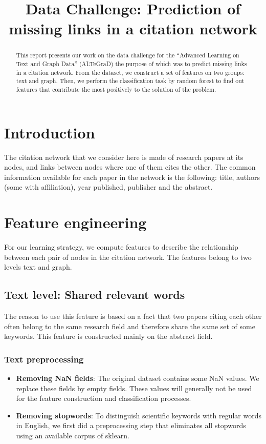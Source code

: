 \documentclass{article}
\title{Data Challenge: Prediction of missing links in a citation network}
\begin{document}
\ninept

\maketitle

\begin{abstract}
This report presents our work on the data challenge for the \enquote{Advanced Learning on Text and Graph Data} (ALTeGraD) the purpose of which was to predict missing links in a citation network. From the dataset, we construct a set of features on two groups: text and graph. Then, we perform the classification task by random forest to find out features that contribute the most positively to the solution of the problem.
\end{abstract}


\section{Introduction}

The citation network that we consider here is made of research papers at its nodes, and links between nodes where one of them cites the other. The common information available for each paper in the network is the following: title, authors (some with affiliation), year published, publisher and the abstract.

\section{Feature engineering}

For our learning strategy, we compute features to describe the relationship between each pair of nodes in the citation network. The features belong to two levels text and graph.

\subsection{Text level: Shared relevant words}

The reason to use this feature is based on a fact that two papers citing each other often belong to the same research field and therefore share the same set of some keywords. This feature is constructed mainly on the abstract field.
\subsubsection{Text preprocessing}
\begin{itemize}
\item \textbf{Removing NaN fields}: The original dataset contains some NaN values. We replace these fields by empty fields. These values will generally not be used for the feature construction and classification processes.
\item \textbf{Removing stopwords}: To distinguish scientific keywords with regular words in English, we first did a preprocessing step that eliminates all stopwords using an available corpus of sklearn.
\end{itemize}
\end{document}
